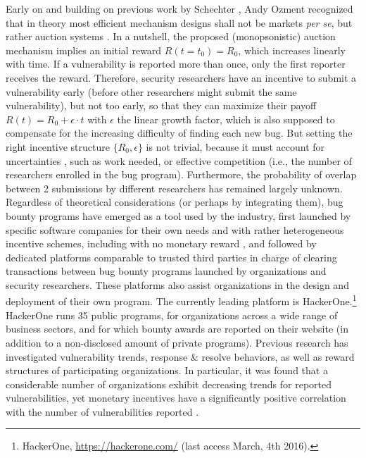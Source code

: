 Early on and building on previous work by Schechter \cite{schechter2002buy}, Andy Ozment \cite{ozment2004bug} recognized that in theory most efficient mechanism designs shall not be markets {\it per se}, but rather auction systems \cite{milgrom1982theory}. In a nutshell, the proposed (monopsonistic) auction mechanism implies an initial reward $R(t=t_0) = R_0$, which increases linearly with time. If a vulnerability is reported more than once, only the first reporter receives the reward. Therefore, security researchers have an incentive to submit a vulnerability early (before other researchers might submit the same vulnerability), but not too early, so that they can maximize their payoff $R(t) = R_0 + \epsilon \cdot t$ with $\epsilon$ the linear growth factor, which is also supposed to compensate for the increasing difficulty of finding each new bug. But setting the right incentive structure $\{R_0,\epsilon \}$ is not trivial, because it must account for uncertainties \cite{pandey2014assessment}, such as work needed, or effective competition (i.e., the number of researchers enrolled in the bug program). Furthermore, the probability of overlap between 2 submissions by different researchers has remained largely unknown.\\

Regardless of theoretical considerations (or perhaps by integrating them), bug bounty programs have emerged as a tool used by the industry, first launched by specific software companies for their own needs and with rather heterogeneous incentive schemes\cite{finifter2013empirical}, including with no monetary reward \cite{zhao2014exploratory}, and followed by dedicated platforms comparable to trusted third parties in charge of clearing transactions between bug bounty programs launched by organizations and security researchers. These platforms also assist organizations in the design and deployment of their own program. The currently leading platform is HackerOne.\footnote{HackerOne, \url{https://hackerone.com/} (last access March, 4th 2016).} HackerOne runs 35 public programs, for organizations across a wide range of business sectors, and for which bounty awards are reported on their website (in addition to a non-disclosed amount of private programs). Previous research has investigated vulnerability trends, response \& resolve behaviors, as well as reward structures of participating organizations. In particular, it was found that a considerable number of organizations exhibit decreasing trends for reported vulnerabilities, yet monetary incentives have a significantly positive correlation with the number of vulnerabilities reported \cite{zhao2015empirical}.